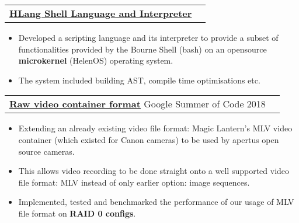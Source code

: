 \documentclass[a4paper,6pt]{article}
\begin{document}
\hspace{5px}
\begin{tabularx}{\textwidth}{X r}
	{\textbf{\href{https://github.com/supragya/HLang}{HLang Shell Language and Interpreter}}} \small & \\
\end{tabularx}
\begin{itemize}
    \item \small Developed a scripting language and its interpreter to provide a subset of functionalities provided by the Bourne Shell (bash) on an opensource \textcolor{mygray}{\textbf{microkernel}} (HelenOS) operating system.
    \item \small The system included building AST, compile time optimisations etc. 
\normalsize
\end{itemize}



\hspace{5px}
\begin{tabularx}{\textwidth}{X r}
	{\textbf{\href{https://github.com/supragya/AXIOM_RawStreamHandler}{Raw video container format}}} \small Google Summer of Code 2018& \\
\end{tabularx}
\begin{itemize}
    \item \small Extending an already existing video file format: Magic Lantern's MLV video container (which existed for Canon cameras) to be used by apertus open source cameras. 
    \item \small This allows video recording to be done straight onto a well supported video file format: MLV instead of only earlier option: image sequences.
    \item \small Implemented, tested and benchmarked the performance of our usage of MLV file format on \textcolor{mygray}{\textbf{RAID 0 configs}}.
\normalsize
\end{itemize}
\end{document}
